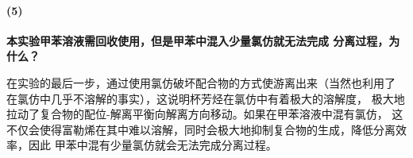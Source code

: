 \documentclass[a4paper,zihao=5,UTF8]{ctexart}
\begin{document}
    \paragraph{(5)}\textbf{本实验甲苯溶液需回收使用，但是甲苯中混入少量氯仿就无法完成
    分离过程，为什么？}
    \par 
    在实验的最后一步，通过使用氯仿破坏配合物的方式使游离出来（当然也利用了
    在氯仿中几乎不溶解的事实），这说明杯芳烃在氯仿中有着极大的溶解度，
    极大地拉动了复合物的配位-解离平衡向解离方向移动。如果在甲苯溶液中混有氯仿，
    这不仅会使得富勒烯在其中难以溶解，同时会极大地抑制复合物的生成，降低分离效率，因此
    甲苯中混有少量氯仿就会无法完成分离过程。


    
	
\end{document}
